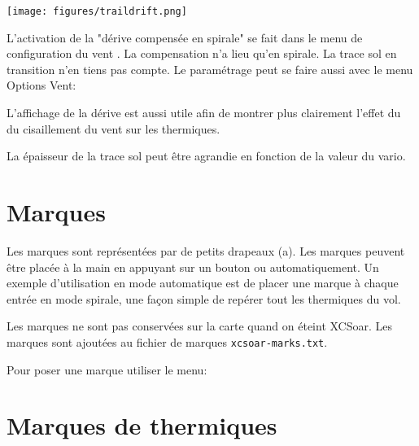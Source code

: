 \begin{center}
\texttt{[image: figures/traildrift.png]}
\end{center}

L'activation de la "dérive compensée en spirale" se fait dans le menu de configuration du vent  .  La compensation n'a lieu qu'en spirale. La trace sol en transition n'en tiens pas compte.
Le paramétrage peut se faire aussi avec le menu Options Vent:
\begin{quote}
\blink{}
\end{quote}

L'affichage de la dérive est aussi utile afin de montrer plus clairement l'effet du du cisaillement du vent sur les thermiques.

La épaisseur de la trace sol peut être agrandie en fonction de la valeur du vario.

\section{Marques}\label{sec:markers}

Les marques sont représentées par de petits drapeaux (a). Les marques peuvent être placée à la main en appuyant sur un bouton ou automatiquement. Un exemple d'utilisation en mode automatique est de placer une marque à chaque entrée en mode spirale, une façon simple de repérer tout les thermiques du vol.

Les marques ne sont pas conservées sur la carte quand on éteint XCSoar. Les marques sont ajoutées au fichier de marques  \verb|xcsoar-marks.txt|.

Pour poser une marque utiliser le menu:
\begin{quote}
\blink{}
\end{quote}

\section{Marques de thermiques}

